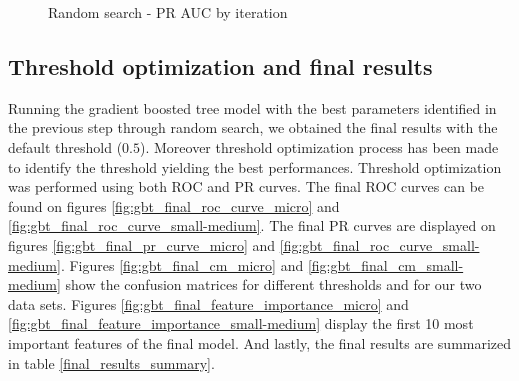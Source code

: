 \documentclass[LaM,binding=0.6cm, english]{sapthesis}
\begin{document}
\begin{figure}[!ht]
  \centering
  \hfill
  \caption{Random search - PR AUC by iteration}
\end{figure}


\subsection{Threshold optimization and final results}

Running the gradient boosted tree model with the best parameters identified in the previous step through random search, we obtained the final results with the default threshold ($0.5$). Moreover threshold optimization process has been made to identify the threshold yielding the best performances. Threshold optimization was performed using both ROC and PR curves. The final ROC curves can be found on figures \ref{fig:gbt_final_roc_curve_micro} and \ref{fig:gbt_final_roc_curve_small-medium}. The final PR curves are displayed on figures \ref{fig:gbt_final_pr_curve_micro} and \ref{fig:gbt_final_roc_curve_small-medium}. Figures \ref{fig:gbt_final_cm_micro} and \ref{fig:gbt_final_cm_small-medium} show the confusion matrices for different thresholds and for our two data sets. Figures \ref{fig:gbt_final_feature_importance_micro} and \ref{fig:gbt_final_feature_importance_small-medium} display the first 10 most important features of the final model. And lastly, the final results are summarized in table \ref{final_results_summary}.
\end{document}
